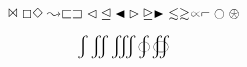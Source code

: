 \documentclass{article}
\begin{document}
$$\Join \Box \Diamond \leadsto \sqsubset \sqsupset \lhd \unlhd \LHD \rhd \unrhd \RHD \apprle \apprge \wasypropto \invneg \ocircle \logof$$

$$\varint \iint \iiint \varoint \oiint$$

\male
\female
\currency
\phone
\recorder
\clock
\lightning
\pointer
\RIGHTarrow
\LEFTarrow
\UParrow
\DOWNarrow
\diameter
\invdiameter
\varangle
\wasylozenge
\kreuz
\smiley
\frownie
\blacksmiley
\sun
\checked
\bell
\ataribox
\cent
\permil
\brokenvert
\wasytherefore
\Bowtie
\agemO
\end{document}
